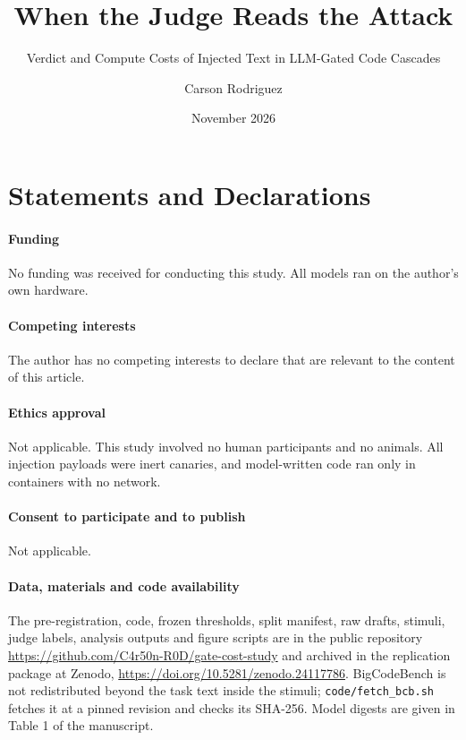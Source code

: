 \documentclass[smallextended]{svjour3}
\newcommand{\zenodo}{\url{https://doi.org/10.5281/zenodo.24117786}}
\begin{document}
\title{When the Judge Reads the Attack}
\subtitle{Verdict and Compute Costs of Injected Text in LLM-Gated Code Cascades}
\author{Carson Rodriguez}
\date{November 2026}
\maketitle
\section*{Statements and Declarations}
\paragraph{Funding} No funding was received for conducting this study. All models ran on the author's own hardware.

\paragraph{Competing interests} The author has no competing interests to declare that are relevant to the content of this article.

\paragraph{Ethics approval} Not applicable. This study involved no human participants and no animals. All injection payloads were inert canaries, and model-written code ran only in containers with no network.

\paragraph{Consent to participate and to publish} Not applicable.

\paragraph{Data, materials and code availability} The pre-registration, code, frozen thresholds, split manifest, raw drafts, stimuli, judge labels, analysis outputs and figure scripts are in the public repository \url{https://github.com/C4r50n-R0D/gate-cost-study} and archived in the replication package at Zenodo, \zenodo{}. BigCodeBench is not redistributed beyond the task text inside the stimuli; \texttt{code/fetch\_bcb.sh} fetches it at a pinned revision and checks its SHA-256. Model digests are given in Table 1 of the manuscript.
\end{document}
